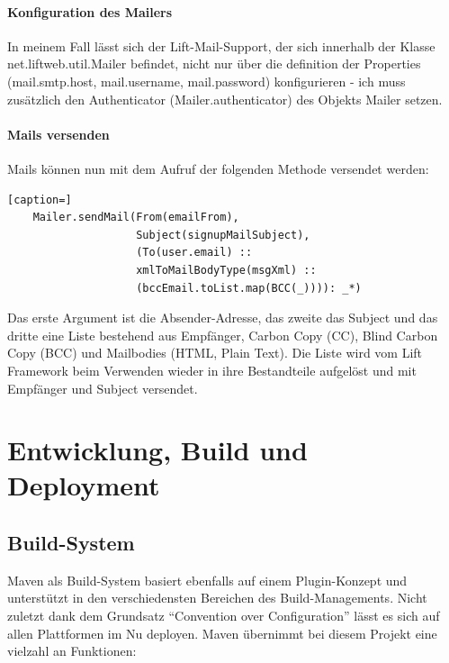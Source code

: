 \subsubsection{Konfiguration des Mailers}
 In meinem Fall l\"asst sich der Lift-Mail-Support, der sich innerhalb der Klasse net.liftweb.util.Mailer befindet, nicht nur \"uber die definition der Properties (mail.smtp.host, mail.username, mail.password) konfigurieren - ich muss zus\"atzlich den Authenticator (Mailer.authenticator) des Objekts Mailer setzen.

 \subsubsection{Mails versenden}
  Mails k\"onnen nun mit dem Aufruf der folgenden Methode versendet werden:
\begin{lstlisting}[caption=]
    Mailer.sendMail(From(emailFrom), 
                    Subject(signupMailSubject),
                    (To(user.email) :: 
                    xmlToMailBodyType(msgXml) ::
                    (bccEmail.toList.map(BCC(_)))): _*)
\end{lstlisting} 

Das erste Argument ist die Absender-Adresse, das zweite das Subject und das dritte eine Liste bestehend aus Empf\"anger, Carbon Copy (CC), Blind Carbon Copy (BCC) und Mailbodies (HTML, Plain Text). Die Liste wird vom Lift Framework beim Verwenden wieder in ihre Bestandteile aufgel\"ost und mit Empf\"anger und Subject versendet. 

\chapter{Entwicklung, Build und Deployment}

\section{Build-System}Maven als Build-System basiert ebenfalls auf einem Plugin-Konzept und unterst\"utzt in den verschiedensten Bereichen des Build-Managements. Nicht zuletzt dank dem Grundsatz ``Convention over Configuration'' l\"asst es sich auf allen Plattformen im Nu deployen. Maven \"ubernimmt bei diesem Projekt eine vielzahl an Funktionen:

